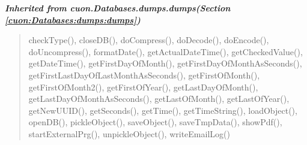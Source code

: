\large{\textbf{\textit{Inherited from cuon.Databases.dumps.dumps\textit{(Section \ref{cuon:Databases:dumps:dumps})}}}}

\begin{quote}
checkType(), closeDB(), doCompress(), doDecode(), doEncode(), doUncompress(), formatDate(), getActualDateTime(), getCheckedValue(), getDateTime(), getFirstDayOfMonth(), getFirstDayOfMonthAsSeconds(), getFirstLastDayOfLastMonthAsSeconds(), getFirstOfMonth(), getFirstOfMonth2(), getFirstOfYear(), getLastDayOfMonth(), getLastDayOfMonthAsSeconds(), getLastOfMonth(), getLastOfYear(), getNewUUID(), getSeconds(), getTime(), getTimeString(), loadObject(), openDB(), pickleObject(), saveObject(), saveTmpData(), showPdf(), startExternalPrg(), unpickleObject(), writeEmailLog()
\end{quote}
